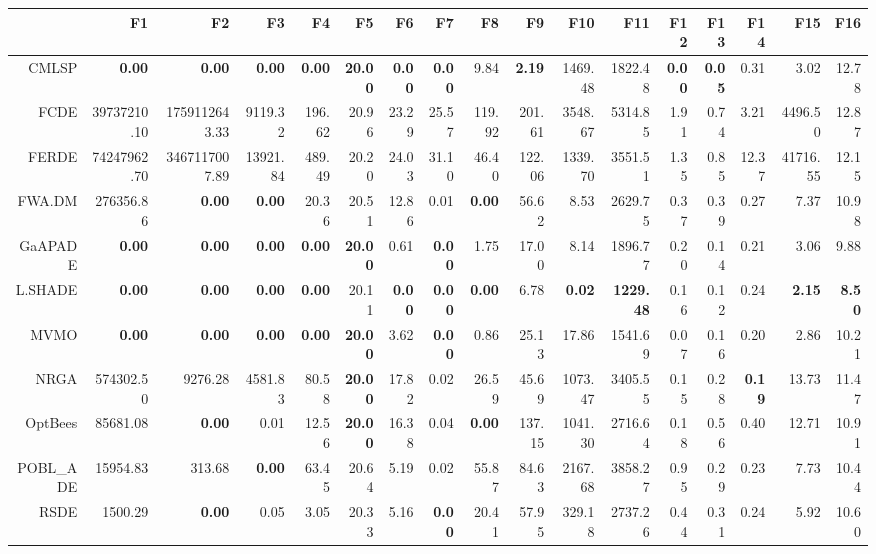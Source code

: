\begin{table}[h!]
\centering
\begingroup\tiny
\begin{tabular}{rrrrrrrrrrrrrrrrr}
  \hline
 & F1 & F2 & F3 & F4 & F5 & F6 & F7 & F8 & F9 & F10 & F11 & F12 & F13 & F14 & F15 & F16 \\ 
  \hline
CMLSP & \textbf{0.00} & \textbf{0.00} & \textbf{0.00} & \textbf{0.00} & \textbf{20.00} & \textbf{0.00} & \textbf{0.00} & 9.84 & \textbf{2.19} & 1469.48 & 1822.48 & \textbf{0.00} & \textbf{0.05} & 0.31 & 3.02 & 12.78 \\ 
  FCDE & 39737210.10 & 1759112643.33 & 9119.32 & 196.62 & 20.96 & 23.29 & 25.57 & 119.92 & 201.61 & 3548.67 & 5314.85 & 1.91 & 0.74 & 3.21 & 4496.50 & 12.87 \\ 
  FERDE & 74247962.70 & 3467117007.89 & 13921.84 & 489.49 & 20.20 & 24.03 & 31.10 & 46.40 & 122.06 & 1339.70 & 3551.51 & 1.35 & 0.85 & 12.37 & 41716.55 & 12.15 \\ 
  FWA.DM & 276356.86 & \textbf{0.00} & \textbf{0.00} & 20.36 & 20.51 & 12.86 & 0.01 & \textbf{0.00} & 56.62 & 8.53 & 2629.75 & 0.37 & 0.39 & 0.27 & 7.37 & 10.98 \\ 
  GaAPADE & \textbf{0.00} & \textbf{0.00} & \textbf{0.00} & \textbf{0.00} & \textbf{20.00} & 0.61 & \textbf{0.00} & 1.75 & 17.00 & 8.14 & 1896.77 & 0.20 & 0.14 & 0.21 & 3.06 & 9.88 \\ 
  L.SHADE & \textbf{0.00} & \textbf{0.00} & \textbf{0.00} & \textbf{0.00} & 20.11 & \textbf{0.00} & \textbf{0.00} & \textbf{0.00} & 6.78 & \textbf{0.02} & \textbf{1229.48} & 0.16 & 0.12 & 0.24 & \textbf{2.15} & \textbf{8.50} \\ 
  MVMO & \textbf{0.00} & \textbf{0.00} & \textbf{0.00} & \textbf{0.00} & \textbf{20.00} & 3.62 & \textbf{0.00} & 0.86 & 25.13 & 17.86 & 1541.69 & 0.07 & 0.16 & 0.20 & 2.86 & 10.21 \\ 
  NRGA & 574302.50 & 9276.28 & 4581.83 & 80.58 & \textbf{20.00} & 17.82 & 0.02 & 26.59 & 45.69 & 1073.47 & 3405.55 & 0.15 & 0.28 & \textbf{0.19} & 13.73 & 11.47 \\ 
  OptBees & 85681.08 & \textbf{0.00} & 0.01 & 12.56 & \textbf{20.00} & 16.38 & 0.04 & \textbf{0.00} & 137.15 & 1041.30 & 2716.64 & 0.18 & 0.56 & 0.40 & 12.71 & 10.91 \\ 
  POBL\_ADE & 15954.83 & 313.68 & \textbf{0.00} & 63.45 & 20.64 & 5.19 & 0.02 & 55.87 & 84.63 & 2167.68 & 3858.27 & 0.95 & 0.29 & 0.23 & 7.73 & 10.44 \\ 
  RSDE & 1500.29 & \textbf{0.00} & 0.05 & 3.05 & 20.33 & 5.16 & \textbf{0.00} & 20.41 & 57.95 & 329.18 & 2737.26 & 0.44 & 0.31 & 0.24 & 5.92 & 10.60 \\ 

\end{tabular}
\end{table}
